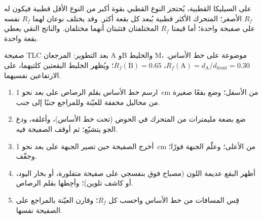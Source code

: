 على السيليكا القطبية، يُحتجز النوع القطبي بقوة أكبر من النوع الأقل
قطبية فيكون له $R_f$ الأصغر؛  المتحرك الأكثر قطبية يُبعد كل بقعة
أكثر. وقد يختلف نوعان لهما $R_f$ نفسه على صفيحة واحدة؛
أما قيمتا $R_f$ المختلفتان فتثبتان أنهما مختلفان. والناتج النقي يعطي
بقعة واحدة.

\begin{omfigure}

{\small صفيحة TLC بعد التطوير: المرجعان A وB والخليط M،
موضوعة على خط الأساس. $R_f(\mathrm{A}) = d_{\mathrm{A}}/d_{\mathrm{front}}
= 0.30$، $R_f(\mathrm{B}) = 0.65$؛ ويُظهر الخليط البقعتين كلتيهما، على
الارتفاعين نفسيهما.}
\end{omfigure}

\begin{method}\label{met:b1:lab-techniques-1:tlc}
\begin{enumerate}
  \item ارسم خط الأساس بقلم الرصاص على بعد نحو \qty{1}{cm} من الأسفل؛ وضع
        بقعًا صغيرة من محاليل مخففة للعيّنة وللمراجع
        جنبًا إلى جنب.
  \item ضع بضعة مليمترات من  المتحرك في الحوض (تحت خط الأساس)،
        وأغلقه، ودع الجو يتشبّع؛ ثم أوقف الصفيحة فيه.
  \item أخرج الصفيحة حين تصير الجبهة على بعد نحو \qty{1}{cm} من الأعلى؛
        وعلّم الجبهة فورًا؛ وجفّف.
  \item أظهر البقع عديمة اللون (مصباح فوق بنفسجي على صفيحة متفلورة،
        أو بخار اليود، أو كاشف تلوين)؛ وأحِطها بقلم الرصاص.
  \item قِس المسافات من خط الأساس واحسب كل $R_f$؛
        وقارن العيّنة بالمراجع على الصفيحة نفسها.
\end{enumerate}
\end{method}

